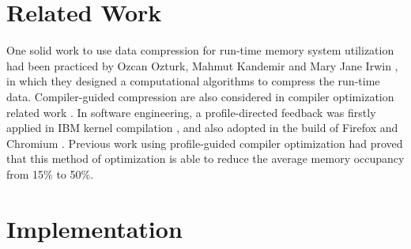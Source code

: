 \documentclass[]{article}
\begin{document}
\section{Related Work}
One solid work to use data compression for run-time memory system utilization had been practiced by Ozcan Ozturk, Mahmut Kandemir and Mary Jane Irwin \cite{OO2009}, in which they designed a computational algorithms to compress the run-time data. Compiler-guided compression are also considered in compiler optimization related work \cite{MSAli2008}\cite{KSKO2017}\cite{MTK2011}. In software engineering, a profile-directed feedback was firstly applied in IBM kernel compilation \cite{IBM}, and also adopted in the build of Firefox and Chromium \cite{firefox}\cite{Chrome}. Previous work using profile-guided compiler optimization had proved that this method of optimization is able to reduce the average memory occupancy from 15\% to 50\%. 
	
\section{Implementation}
\end{document}
